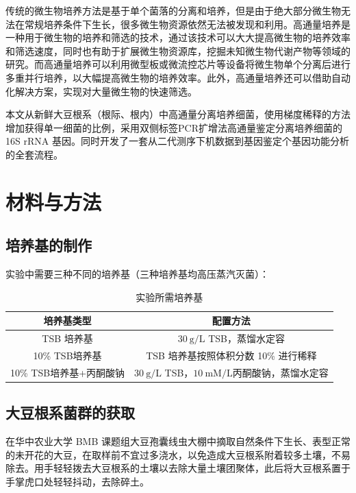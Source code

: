 \documentclass[UTF8]{ctexart}
\begin{document}
    传统的微生物培养方法是基于单个菌落的分离和培养，但是由于绝大部分微生物无法在常规培养条件下生长，很多微生物资源依然无法被发现和利用。高通量培养是一种用于微生物的培养和筛选的技术，通过该技术可以大大提高微生物的培养效率和筛选速度，同时也有助于扩展微生物资源库，挖掘未知微生物代谢产物等领域的研究。而高通量培养可以利用微型板或微流控芯片等设备将微生物单个分离后进行多重并行培养，以大幅提高微生物的培养效率。此外，高通量培养还可以借助自动化解决方案，实现对大量微生物的快速筛选。

    本文从新鲜大豆根系（根际、根内）中高通量分离培养细菌，使用梯度稀释的方法增加获得单一细菌的比例，采用双侧标签PCR扩增法高通量鉴定分离培养细菌的 16S rRNA 基因。同时开发了一套从二代测序下机数据到基因鉴定个基因功能分析的全套流程。

    \section{材料与方法}

    \subsection{培养基的制作}

    实验中需要三种不同的培养基（三种培养基均高压蒸汽灭菌）：

    \begin{table}[htb]
        \centering
        \caption{实验所需培养基}
        \begin{tabular}{cc}
            \toprule
            培养基类型 & 配置方法\\
            \midrule
            TSB 培养基 & $\mathrm{30~g/L}$ TSB，蒸馏水定容\\
            10\% TSB培养基 & TSB 培养基按照体积分数 10\% 进行稀释\\
            10\% TSB培养基+丙酮酸钠 & $\mathrm{30~g/L}$ TSB，$\mathrm{10~mM/L} $丙酮酸钠，蒸馏水定容\\
            \bottomrule
        \end{tabular}
    \end{table}

    \subsection{大豆根系菌群的获取}

    在华中农业大学 BMB 课题组大豆孢囊线虫大棚中摘取自然条件下生长、表型正常的未开花的大豆，在取样前不宜过多浇水，以免造成大豆根系附着较多土壤，不易除去。用手轻轻拨去大豆根系的土壤以去除大量土壤团聚体，此后将大豆根系置于手掌虎口处轻轻抖动，去除碎土。
\end{document}
